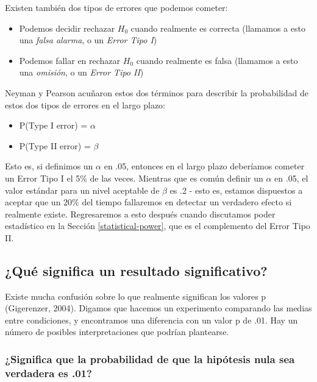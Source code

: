\documentclass[
  12pt,
]{book}
\providecommand{\tightlist}{%
  \setlength{\itemsep}{0pt}\setlength{\parskip}{0pt}}
\begin{document}
Existen también dos tipos de errores que podemos cometer:

\begin{itemize}
\tightlist
\item
  Podemos decidir rechazar \(H_0\) cuando realmente es correcta (llamamos a esto una \emph{falsa alarma}, o un \emph{Error Tipo I})
\item
  Podemos fallar en rechazar \(H_0\) cuando realmente es falsa (llamamos a esto una \emph{omisión}, o un \emph{Error Tipo II})
\end{itemize}

Neyman y Pearson acuñaron estos dos términos para describir la probabilidad de estos dos tipos de errores en el largo plazo:

\begin{itemize}
\tightlist
\item
  P(Type I error) = \(\alpha\)
\item
  P(Type II error) = \(\beta\)
\end{itemize}

Esto es, si definimos un \(\alpha\) en .05, entonces en el largo plazo deberíamos cometer un Error Tipo I el 5\% de las veces. Mientras que es común definir un \(\alpha\) en .05, el valor estándar para un nivel aceptable de \(\beta\) es .2 - esto es, estamos dispuestos a aceptar que un 20\% del tiempo fallaremos en detectar un verdadero efecto si realmente existe. Regresaremos a esto después cuando discutamos poder estadístico en la Sección \ref{statistical-power}, que es el complemento del Error Tipo II.

\hypertarget{quuxe9-significa-un-resultado-significativo}{%
\subsection{¿Qué significa un resultado significativo?}\label{quuxe9-significa-un-resultado-significativo}}

Existe mucha confusión sobre lo que realmente significan los valores p (Gigerenzer, 2004). Digamos que hacemos un experimento comparando las medias entre condiciones, y encontramos una diferencia con un valor p de .01. Hay un número de posibles interpretaciones que podrían plantearse.

\hypertarget{significa-que-la-probabilidad-de-que-la-hipuxf3tesis-nula-sea-verdadera-es-.01}{%
\subsubsection{¿Significa que la probabilidad de que la hipótesis nula sea verdadera es .01?}\label{significa-que-la-probabilidad-de-que-la-hipuxf3tesis-nula-sea-verdadera-es-.01}}
\end{document}
